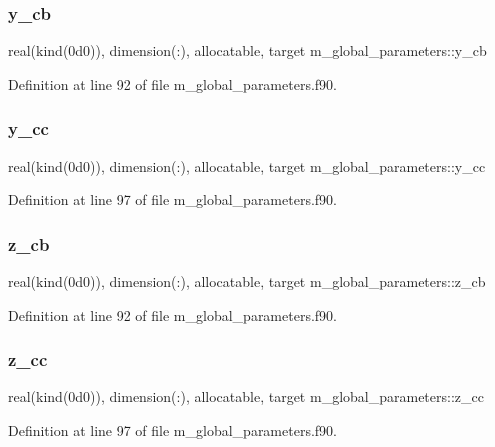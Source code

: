 \subsubsection{\texorpdfstring{y\+\_\+cb}{y\_cb}}
{\footnotesize\ttfamily real(kind(0d0)), dimension(\+:), allocatable, target m\+\_\+global\+\_\+parameters\+::y\+\_\+cb}



Definition at line 92 of file m\+\_\+global\+\_\+parameters.\+f90.

\mbox{\label{namespacem__global__parameters_aaa584e01b4153d246d84eef286482632}} 
\subsubsection{\texorpdfstring{y\+\_\+cc}{y\_cc}}
{\footnotesize\ttfamily real(kind(0d0)), dimension(\+:), allocatable, target m\+\_\+global\+\_\+parameters\+::y\+\_\+cc}



Definition at line 97 of file m\+\_\+global\+\_\+parameters.\+f90.

\mbox{\label{namespacem__global__parameters_aa75fcd53fdc4fb58ca0fbc2cc9678673}} 
\subsubsection{\texorpdfstring{z\+\_\+cb}{z\_cb}}
{\footnotesize\ttfamily real(kind(0d0)), dimension(\+:), allocatable, target m\+\_\+global\+\_\+parameters\+::z\+\_\+cb}



Definition at line 92 of file m\+\_\+global\+\_\+parameters.\+f90.

\mbox{\label{namespacem__global__parameters_a9fef803dde37fd067fd4b2215df851b9}} 
\subsubsection{\texorpdfstring{z\+\_\+cc}{z\_cc}}
{\footnotesize\ttfamily real(kind(0d0)), dimension(\+:), allocatable, target m\+\_\+global\+\_\+parameters\+::z\+\_\+cc}



Definition at line 97 of file m\+\_\+global\+\_\+parameters.\+f90.

